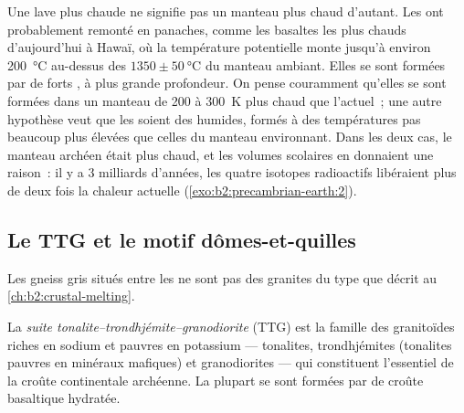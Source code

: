 Une lave plus chaude ne signifie pas un manteau plus chaud d'autant. Les  ont probablement remonté en
panaches, comme les basaltes les plus chauds d'aujourd'hui à Hawaï, où la température potentielle monte
jusqu'à environ \qty{200}{\celsius} au-dessus des $1350 \pm \qty{50}{\celsius}$ du manteau ambiant. Elles se sont
formées par de forts , à plus grande profondeur. On pense couramment qu'elles se sont formées dans un
manteau de 200 à \qty{300}{K} plus chaud que l'actuel~; une autre hypothèse veut que les 
soient des  humides, formés à des températures pas beaucoup plus élevées que celles du manteau environnant.
Dans les deux cas, le manteau archéen était plus chaud, et les volumes scolaires en donnaient une raison~:
il y a 3 milliards d'années, les quatre isotopes radioactifs libéraient plus de
deux fois la chaleur actuelle (\cref{exo:b2:precambrian-earth:2}).

\subsection*{Le TTG et le motif dômes-et-quilles}

Les gneiss gris situés entre les  ne sont pas des granites du type que
décrit au \cref{ch:b2:crustal-melting}.

\begin{definition}\label{def:b2:precambrian-earth:ttg}
La \emph{suite tonalite--trondhjémite--granodiorite}
(TTG) est la famille des granitoïdes riches en sodium et pauvres en potassium --- tonalites,
trondhjémites (tonalites pauvres en minéraux mafiques) et granodiorites --- qui constituent l'essentiel
de la croûte continentale archéenne. La plupart se sont formées par  de croûte basaltique
hydratée.
\end{definition}

